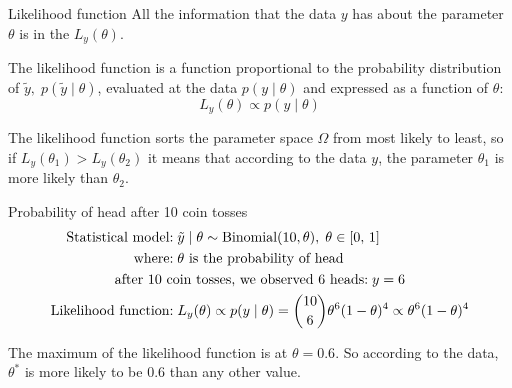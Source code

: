 \begin{definition}{Likelihood function}{}{}
	All the information that the data $y$ has about the parameter $\theta$ is in the
	 $L_y(\theta)$.

	The likelihood function is a function proportional to the probability distribution
	of $\tilde{y},\; p(\tilde{y}\mid\theta)$, evaluated at the data $p(y \mid \theta)$
	and expressed as a function of $\theta$:
	\begin{equation}
		L_y(\theta) \propto p(y \mid \theta)
	\end{equation}

    \tcblower
The likelihood function sorts the parameter space $\Omega$ from most likely to least,
so if $L_y(\theta_1) > L_y(\theta_2)$ it means that according to the data $y$,
the parameter $\theta_1$ is more likely than $\theta_2$.
\end{definition}

\begin{example}{Probability of head after 10 coin tosses}{}
	\begin{alignat*}{1}
		\text{Statistical model:}   & \; \tilde y \mid \theta \sim \text{Binomial}(10, \theta), \; \theta \in [0,\,1] \\
		\text{where:}               & \; \theta \text{ is the probability of head}                                    \\
		\span \text{after 10 coin tosses, we observed 6 heads:} \; y = 6                                              \\
		\text{Likelihood function:} & \; L_y(\theta) \propto p(y \mid \theta) = \binom{10}{6} \theta^6 (1-\theta)^4
		\propto \theta^6 (1-\theta)^4
	\end{alignat*}
	\begin{nscenter}
	\end{nscenter}
	The maximum of the likelihood function is at $\theta = 0.6$. So according to the data,
	$\theta^*$ is more likely to be 0.6 than any other value.
\end{example}

